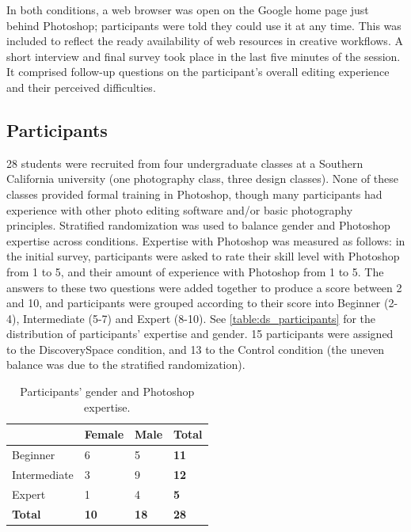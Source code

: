 In both conditions, a web browser was open on the Google home page just behind Photoshop; participants were told they could use it at any time. This was included to reflect the ready availability of web resources in creative workflows. A short interview and final survey took place in the last five minutes of the session. It comprised follow-up questions on the participant's overall editing experience and their perceived difficulties. 

\subsection{Participants}
28 students were recruited from four undergraduate classes at a Southern California university (one photography class, three design classes). None of these classes provided formal training in Photoshop, though many participants had experience with other photo editing software and/or basic photography principles. Stratified randomization was used to balance gender and Photoshop expertise across conditions. Expertise with Photoshop was measured as follows: in the initial survey, participants were asked to rate their skill level with Photoshop from 1 to 5, and their amount of experience with Photoshop from 1 to 5. The answers to these two questions were added together to produce a score between 2 and 10, and participants were grouped according to their score into Beginner (2-4), Intermediate (5-7) and Expert (8-10). See \autoref{table:ds_participants} for the distribution of participants' expertise and gender. 15 participants were assigned to the Discovery\-Space condition, and 13 to the Control condition (the uneven balance was due to the stratified randomization).

\begin{table}[]
\centering
\begin{tabular}{l|lll}
 & Female & Male & \textbf{Total} \\ \hline
Beginner & 6 & 5 & \textbf{11} \\
Intermediate & 3 & 9 & \textbf{12} \\
Expert & 1 & 4 & \textbf{5} \\
\textbf{Total} & \textbf{10} & \textbf{18} & \textbf{28}
\end{tabular}
\caption{Participants' gender and Photoshop expertise.}~\label{table:ds_participants}
\end{table}

